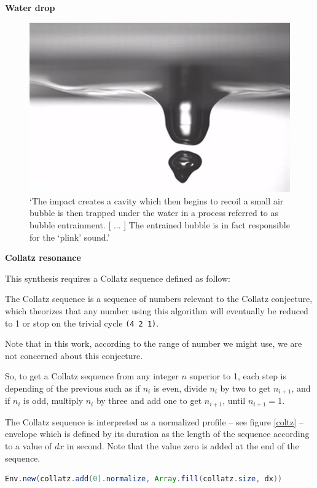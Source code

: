 \noindent  \textbf{
  Water drop }
  
\label{wd}

\smallskip

\begin{figure}[H]
\begin{center}
\includegraphics[width=0.65\linewidth]{img/3187} 
\caption{`The impact creates a cavity which then begins to recoil a small air bubble is then trapped under the water in a process referred to as bubble entrainment. [ ... ] The entrained bubble is in fact responsible for the ‘plink’ sound.' \citep{sdw}}
\label{dropwater}
\end{center}
\end{figure}

\noindent \textbf{
  Collatz resonance }

\label{colres}

\smallskip
This synthesis requires a Collatz sequence defined as follow:

{The Collatz sequence is a sequence of numbers relevant to the Collatz conjecture, which theorizes that any number using this algorithm will eventually be reduced to 1 or stop on the trivial cycle \texttt{(4 2 1)}.

Note that in this work, according to the range of number we might use, we are not concerned about this conjecture.

So, to get a Collatz sequence from any integer $n$ superior to 1, each step is depending of the previous such as if $n_i$ is even, divide $n_i$ by two to get $n_{i+1}$, and if $n_i$ is odd, multiply $n_i$ by three and add one to get $n_{i+1}$, until $n_{i+1}=1$. 
} 


The Collatz sequence is interpreted as a normalized profile -- see figure \ref{coltz} -- envelope which is defined by its duration as the length of the sequence according to a value of $dx$ in second. Note that the value zero is added at the end of the sequence.
\begin{lstlisting}[basicstyle=\footnotesize\ttfamily,language=Java]
Env.new(collatz.add(0).normalize, Array.fill(collatz.size, dx))
\end{lstlisting} 

